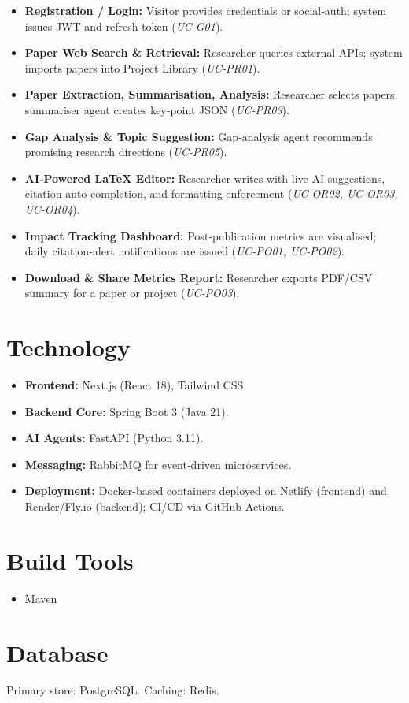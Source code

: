 \documentclass[11pt]{article}
\begin{document}
\begin{itemize}
    \item \textbf{Registration / Login:} Visitor provides credentials or social‑auth; system issues JWT and refresh token (\emph{UC‑G01}).
    \item \textbf{Paper Web Search \& Retrieval:} Researcher queries external APIs; system imports papers into Project Library (\emph{UC‑PR01}).
    \item \textbf{Paper Extraction, Summarisation, Analysis:} Researcher selects papers; summariser agent creates key‑point JSON (\emph{UC‑PR03}).
    \item \textbf{Gap Analysis \& Topic Suggestion:} Gap‑analysis agent recommends promising research directions (\emph{UC‑PR05}).
    \item \textbf{AI‑Powered \LaTeX{} Editor:} Researcher writes with live AI suggestions, citation auto‑completion, and formatting enforcement (\emph{UC‑OR02, UC‑OR03, UC‑OR04}).
    \item \textbf{Impact Tracking Dashboard:} Post‑publication metrics are visualised; daily citation‑alert notifications are issued (\emph{UC‑PO01, UC‑PO02}).
    \item \textbf{Download \& Share Metrics Report:} Researcher exports PDF/CSV summary for a paper or project (\emph{UC‑PO03}).
\end{itemize}

\vspace{1.2em}
\section*{Technology}

\begin{itemize}
    \item \textbf{Frontend:} Next.js (React 18), Tailwind CSS.
    \item \textbf{Backend Core:} Spring Boot 3 (Java 21).
    \item \textbf{AI Agents:} FastAPI (Python 3.11).
    \item \textbf{Messaging:} RabbitMQ for event‑driven microservices.
    \item \textbf{Deployment:} Docker-based containers deployed on Netlify (frontend) and Render/Fly.io (backend); CI/CD via GitHub Actions.
\end{itemize}

\vspace{1.2em}
\section*{Build Tools}

\begin{itemize}
    \item Maven
\end{itemize}

\vspace{1.2em}
\section*{Database}

\justifying
Primary store: PostgreSQL. Caching: Redis.
\end{document}
